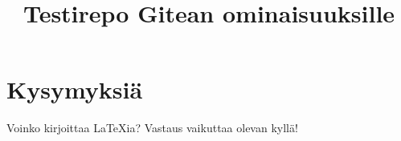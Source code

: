 \documentclass[a4paper]{artikel3}
\title{Testirepo Gitean ominaisuuksille}
\begin{document}
\maketitle
\section*{Kysymyksiä}
Voinko kirjoittaa \LaTeX ia? Vastaus vaikuttaa olevan kyllä!
\end{document}
